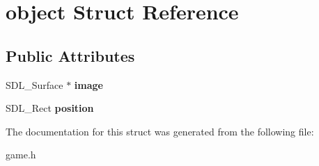 \hypertarget{structobject}{}\section{object Struct Reference}
\label{structobject}
\subsection*{Public Attributes}
\begin{DoxyCompactItemize}
\item 
\mbox{\label{structobject_ae8f96dd75368fdcaecd7186e0cf6795b}} 
S\+D\+L\+\_\+\+Surface $\ast$ {\bfseries image}
\item 
\mbox{\label{structobject_a3285ee8872b0cc5eac8a3ab962eaca8d}} 
S\+D\+L\+\_\+\+Rect {\bfseries position}
\end{DoxyCompactItemize}


The documentation for this struct was generated from the following file\+:\begin{DoxyCompactItemize}
\item 
game.\+h\end{DoxyCompactItemize}
